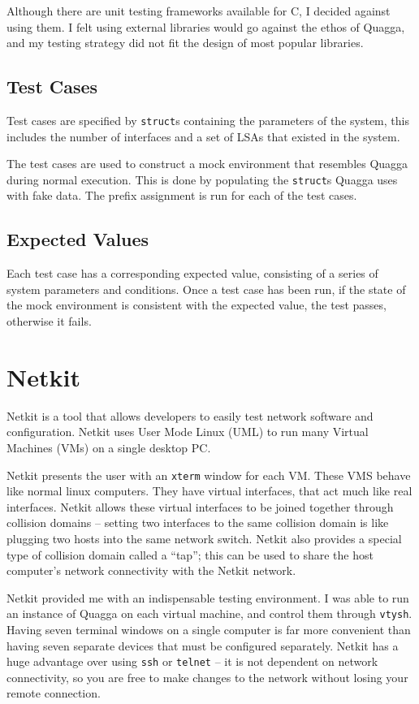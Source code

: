 \documentclass[12pt]{report}
\begin{document}
Although there are unit testing frameworks available for C, I decided against
using them.  I felt using external libraries  would go against the ethos of
Quagga, and my testing strategy did not fit the design of most popular
libraries. 

\subsection{Test Cases}
Test cases are specified by \texttt{struct}s containing the parameters of
the system, this includes the number of interfaces and a set of LSAs that
existed in the system. 

The test cases are used to construct a mock environment that resembles
Quagga during normal execution. This is done by populating the \texttt{struct}s
Quagga uses with fake data. The prefix assignment is run for each of the test
cases. 

\subsection{Expected Values}
Each test case has a corresponding expected value, consisting of a
series of system parameters and conditions. Once a test case has been run, if
the state of the mock environment is consistent with the expected value, the
test passes, otherwise it fails. 

\section{Netkit} 
Netkit is a tool that allows developers to easily test network software and
configuration. Netkit uses User Mode Linux (UML)  to run many Virtual Machines (VMs) 
on a single desktop PC. 

Netkit presents the user with an \texttt{xterm} window for each VM\@. These VMS
behave like normal linux computers. They have virtual interfaces, that act much
like real interfaces. Netkit allows these virtual interfaces to be joined
together through collision domains -- setting two interfaces to the same
collision domain is like plugging two hosts into the same network switch.
Netkit also provides a special type of collision domain called a ``tap''; this
can be used to share the host computer's network connectivity with the Netkit
network.

Netkit provided me with an indispensable testing environment. I was able to run
an instance of Quagga on each virtual machine, and control them through
\texttt{vtysh}. Having seven terminal windows on a single computer is far more
convenient than having seven separate devices that must be configured
separately. Netkit has a huge advantage over using \texttt{ssh} or
\texttt{telnet} -- it is not dependent on network connectivity, so you are free
to make changes to the network without losing your remote connection.
\end{document}
